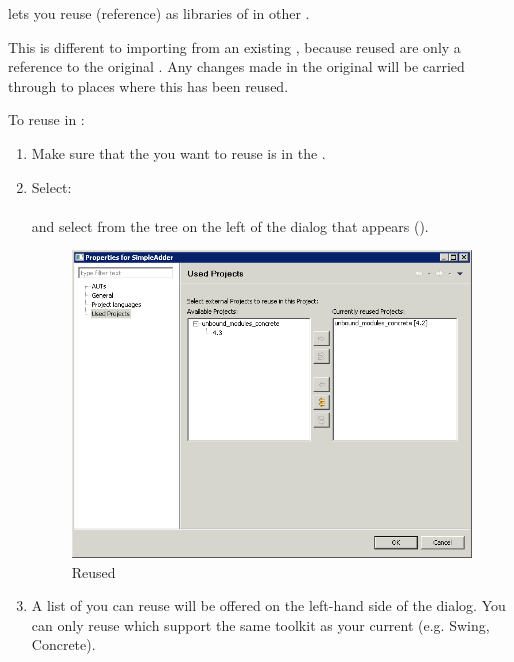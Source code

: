 \jb{} lets you reuse (reference) \gdprojects{} as libraries of \gdcases{} in other \gdprojects{}. 

This is different to importing \gdcases{} from an existing \gdproject{} , because reused \gdprojects{} are only a reference to the original \gdproject{}. Any changes made in the original \gdproject{} will be carried through to places where this \gdproject{} has been reused. 

To reuse \gdprojects{} in \jb{}:
\begin{enumerate}
\item Make sure that the \gdproject{} you want to reuse is in the \gddb{}.
\item Select:\\
\\
and select  from the tree on the left of the dialog that appears ().

\begin{figure}[h]
\begin{center}
\includegraphics[width=12.5cm]{Tasks/Projects/PS/reuseproject}
\caption{Reused \gdprojects{}}
\label{reuseproject}
\end{center}
\end{figure}

\item A list of \gdprojects{} you can reuse will be offered on the left-hand side of the dialog. You can only reuse \gdprojects{} which support the same toolkit as your current \gdproject{} (e.g. Swing, Concrete).


\end{enumerate}
